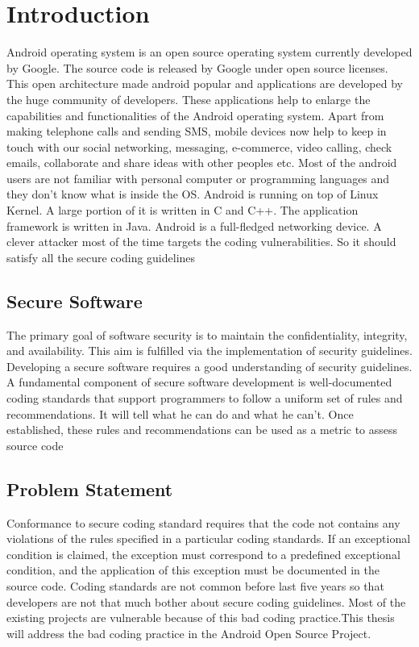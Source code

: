 \chapter{Introduction}

Android operating system is an open source operating system currently developed by Google. The source code is released by Google under open source licenses. This open architecture made android popular and applications are developed by the huge community of developers. These applications help to enlarge the capabilities and functionalities of the Android operating system.  Apart from making telephone calls and sending SMS, mobile devices now help to keep in touch with our social networking, messaging, e-commerce,  video calling, check emails, collaborate and share ideas with other peoples etc. Most of the android users are not familiar with personal computer or programming languages and they don't know what is inside the OS. Android is running on top of Linux Kernel. A large portion of it is written in C and C++. The application framework is written in Java.  Android is a full-fledged networking device. A clever attacker most of the time targets the coding vulnerabilities. So it should satisfy all the secure coding guidelines 
\section{Secure Software}
The primary goal of software
security is to maintain the confidentiality, integrity, and availability. This aim is fulfilled via the implementation of security guidelines. Developing a secure software requires a good understanding of security guidelines.
A fundamental component of secure software development is well-documented coding standards that support programmers to follow a uniform set of rules and
recommendations. It will tell what he can do and what he can't. Once established, these rules and
recommendations can be used as a metric
to assess source code\cite{nist}
\newpage
\section{Problem Statement}

Conformance to secure coding standard requires that the code not contains any violations of the rules specified in a particular coding standards. If an exceptional condition is claimed, the exception must correspond to a predefined exceptional condition, and the application of this exception must be documented in the source code\cite{cert-c}. Coding standards are not common before last five years so that developers are not that much bother about secure coding guidelines. Most of the existing projects are vulnerable because of this bad coding practice.This thesis will address the bad coding practice in the Android Open Source Project.
